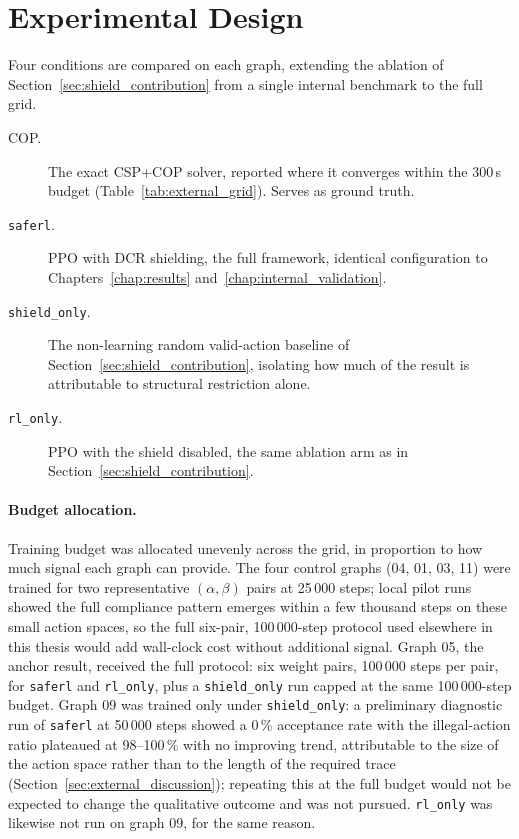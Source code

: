 \section{Experimental Design}
\label{sec:external_design}

Four conditions are compared on each graph, extending the ablation of
Section~\ref{sec:shield_contribution} from a single internal benchmark
to the full grid.

\begin{description}
    \item[COP.] The exact CSP+COP solver, reported where it converges
    within the 300\,s budget (Table~\ref{tab:external_grid}). Serves as
    ground truth.
    \item[\textnormal{\texttt{saferl}}.] \ac{PPO} with \ac{DCR}
    shielding, the full framework, identical configuration to
    Chapters~\ref{chap:results} and~\ref{chap:internal_validation}.
    \item[\textnormal{\texttt{shield\_only}}.] The non-learning random
    valid-action baseline of Section~\ref{sec:shield_contribution},
    isolating how much of the result is attributable to structural
    restriction alone.
    \item[\textnormal{\texttt{rl\_only}}.] \ac{PPO} with the shield
    disabled, the same ablation arm as in
    Section~\ref{sec:shield_contribution}.
\end{description}

\paragraph{Budget allocation.}
Training budget was allocated unevenly across the grid, in proportion
to how much signal each graph can provide. The four control graphs
(04, 01, 03, 11) were trained for two representative
$(\alpha,\beta)$ pairs at 25\,000 steps; local pilot runs showed the
full compliance pattern emerges within a few thousand steps on these
small action spaces, so the full six-pair, 100\,000-step protocol used
elsewhere in this thesis would add wall-clock cost without additional
signal. Graph 05, the anchor result, received the full protocol: six
weight pairs, 100\,000 steps per pair, for \texttt{saferl} and
\texttt{rl\_only}, plus a \texttt{shield\_only} run capped at the same
100\,000-step budget. Graph 09 was trained only under
\texttt{shield\_only}: a preliminary diagnostic run of \texttt{saferl}
at 50\,000 steps showed a 0\,\% acceptance rate with the illegal-action
ratio plateaued at 98--100\,\% with no improving trend, attributable to
the size of the action space rather than to the length of the
required trace (Section~\ref{sec:external_discussion}); repeating this
at the full budget would not be expected to change the qualitative
outcome and was not pursued. \texttt{rl\_only} was likewise not run on
graph 09, for the same reason.

